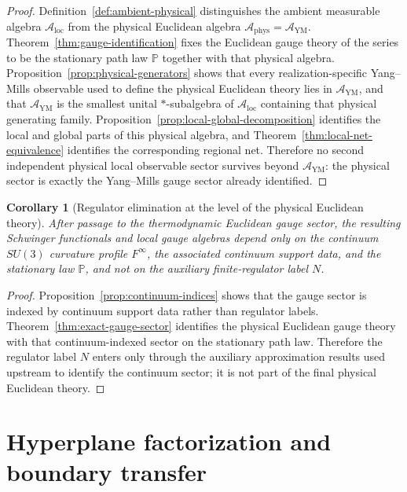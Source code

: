 \documentclass[11pt]{article}
\newtheorem{corollary}[theorem]{Corollary}
\theoremstyle{definition}
\theoremstyle{remark}
\newcommand{\mcA}{\mathcal A}
\begin{document}
\begin{proof}
Definition~\ref{def:ambient-physical} distinguishes the ambient measurable
algebra \(\mcA_{\mathrm{loc}}\) from the physical Euclidean algebra
\(\mcA_{\mathrm{phys}}=\mcA_{\mathrm{YM}}\).  Theorem~\ref{thm:gauge-identification}
fixes the Euclidean gauge theory of the series to be the stationary path law
\(\mathbb P\) together with that physical algebra.  Proposition~\ref{prop:physical-generators}
shows that every realization-specific Yang--Mills observable used to define the
physical Euclidean theory lies in \(\mcA_{\mathrm{YM}}\), and that
\(\mcA_{\mathrm{YM}}\) is the smallest unital \( * \)-subalgebra of
\(\mcA_{\mathrm{loc}}\) containing that physical generating family.
Proposition~\ref{prop:local-global-decomposition} identifies the local and
global parts of this physical algebra, and Theorem~\ref{thm:local-net-equivalence}
identifies the corresponding regional net.  Therefore no second independent
physical local observable sector survives beyond \(\mcA_{\mathrm{YM}}\): the
physical sector is exactly the Yang--Mills gauge sector already identified.
\end{proof}

\begin{corollary}[Regulator elimination at the level of the physical Euclidean theory]
\label{cor:regulator-elimination}
After passage to the thermodynamic Euclidean gauge sector, the resulting
Schwinger functionals and local gauge algebras depend only on the continuum
\(SU(3)\) curvature profile \(F^\infty\), the associated continuum support
data, and the stationary law \(\mathbb P\), and not on the auxiliary
finite-regulator label \(N\).
\end{corollary}

\begin{proof}
Proposition~\ref{prop:continuum-indices} shows that the gauge sector is indexed
by continuum support data rather than regulator labels.  Theorem~\ref{thm:exact-gauge-sector}
identifies the physical Euclidean gauge theory with that continuum-indexed
sector on the stationary path law.  Therefore the regulator label \(N\) enters
only through the auxiliary approximation results used upstream to identify the
continuum sector; it is not part of the final physical Euclidean theory.
\end{proof}

\section{Hyperplane factorization and boundary transfer}
\end{document}

